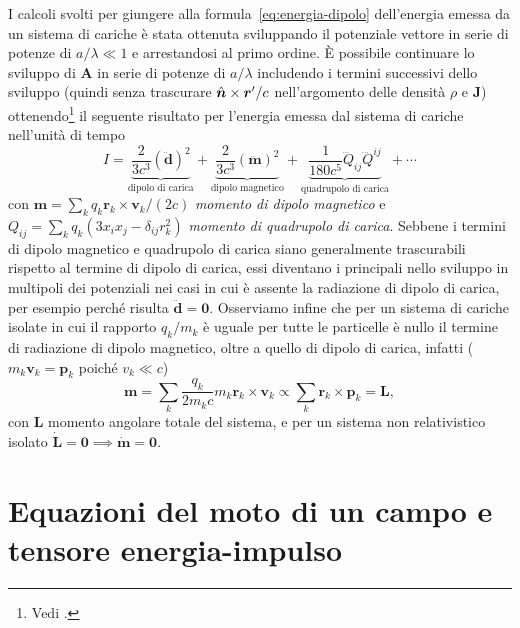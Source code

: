 I calcoli svolti per giungere alla formula~\eqref{eq:energia-dipolo}
dell'energia emessa da un sistema di cariche è stata ottenuta sviluppando il
potenziale vettore in serie di potenze di $a/\lambda \ll 1$ e arrestandosi al
primo ordine.  È possibile continuare lo sviluppo di $\bm{A}$ in serie di
potenze di $a/\lambda$ includendo i termini successivi dello sviluppo (quindi
senza trascurare $\hat{\bm{n}}\times\bm{r}'/c$ nell'argomento delle densità $\rho$
e $\bm{J}$) ottenendo\footnote{Vedi \textcite[249-251]{landau:campi}.} il
seguente risultato per l'energia emessa dal sistema di cariche nell'unità di
tempo
\begin{equation}
  \label{eq:potenza-onde-em}
  I = \underbrace{\frac{2}{3c^{3}} (\ddot{\bm{d}})^{2}}_{\text{dipolo di carica}} +
  \underbrace{\frac{2}{3c^{3}} (\ddot{\bm{m}})^{2}}_{\text{dipolo magnetico}} +
  \underbrace{\frac{1}{180c^{5}}
    \dddot{Q}_{ij}\dddot{Q}^{ij}}_{\text{quadrupolo di carica}} + \cdots
\end{equation}
con $\bm{m} = \sum_{k} q_{k} \bm{r}_{k} \times \bm{v}_{k}/(2c)$
\emph{momento di dipolo magnetico} e
$Q_{ij} = \sum_{k} q_{k}(3x_{i}x_{j} - \delta_{ij}r_{k}^{2})$
\emph{momento di quadrupolo di carica}.
Sebbene i termini di dipolo magnetico e quadrupolo di carica siano generalmente
trascurabili rispetto al termine di dipolo di carica, essi diventano i
principali nello sviluppo in multipoli dei potenziali nei casi in cui è assente
la radiazione di dipolo di carica, per esempio perché risulta
$\ddot{\bm{d}} = \bm{0}$.  Osserviamo infine che per un sistema di cariche
isolate in cui il rapporto $q_{k}/m_{k}$ è uguale per tutte le particelle è
nullo il termine di radiazione di dipolo magnetico, oltre a quello di dipolo di
carica, infatti ($m_{k} \bm{v}_{k} = \bm{p}_{k}$ poiché $v_{k} \ll c$)
\begin{equation}
  \bm{m} = \sum_{k} \frac{q_{k}}{2m_{k}c} m_{k} \bm{r}_{k} \times \bm{v}_{k}
  \propto \sum_{k} \bm{r}_{k} \times \bm{p}_{k} = \bm{L},
\end{equation}
con $\bm{L}$ momento angolare totale del sistema, e per un sistema non
relativistico isolato $\dot{\bm{L}} = \bm{0} \implies \dot{\bm{m}} = \bm{0}$.

\section{Equazioni del moto di un campo e tensore energia-impulso}
\label{sec:tensore-energia-impulso}

